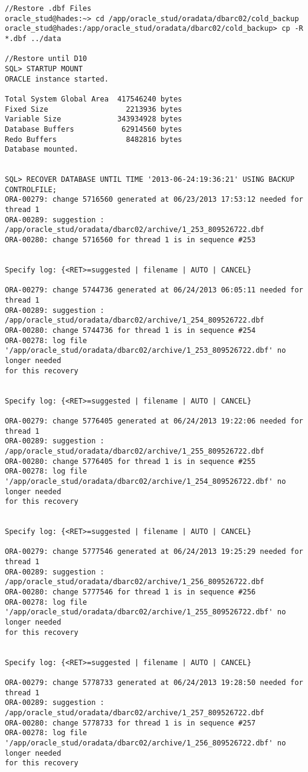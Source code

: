 \documentclass[11pt,a4paper,parskip=half]{scrartcl}
\begin{document}
\begin{lstlisting}
//Restore .dbf Files
oracle_stud@hades:~> cd /app/oracle_stud/oradata/dbarc02/cold_backup
oracle_stud@hades:/app/oracle_stud/oradata/dbarc02/cold_backup> cp -R *.dbf ../data

//Restore until D10
SQL> STARTUP MOUNT
ORACLE instance started.

Total System Global Area  417546240 bytes
Fixed Size                  2213936 bytes
Variable Size             343934928 bytes
Database Buffers           62914560 bytes
Redo Buffers                8482816 bytes
Database mounted.


SQL> RECOVER DATABASE UNTIL TIME '2013-06-24:19:36:21' USING BACKUP CONTROLFILE;
ORA-00279: change 5716560 generated at 06/23/2013 17:53:12 needed for thread 1
ORA-00289: suggestion :
/app/oracle_stud/oradata/dbarc02/archive/1_253_809526722.dbf
ORA-00280: change 5716560 for thread 1 is in sequence #253


Specify log: {<RET>=suggested | filename | AUTO | CANCEL}

ORA-00279: change 5744736 generated at 06/24/2013 06:05:11 needed for thread 1
ORA-00289: suggestion :
/app/oracle_stud/oradata/dbarc02/archive/1_254_809526722.dbf
ORA-00280: change 5744736 for thread 1 is in sequence #254
ORA-00278: log file
'/app/oracle_stud/oradata/dbarc02/archive/1_253_809526722.dbf' no longer needed
for this recovery


Specify log: {<RET>=suggested | filename | AUTO | CANCEL}

ORA-00279: change 5776405 generated at 06/24/2013 19:22:06 needed for thread 1
ORA-00289: suggestion :
/app/oracle_stud/oradata/dbarc02/archive/1_255_809526722.dbf
ORA-00280: change 5776405 for thread 1 is in sequence #255
ORA-00278: log file
'/app/oracle_stud/oradata/dbarc02/archive/1_254_809526722.dbf' no longer needed
for this recovery


Specify log: {<RET>=suggested | filename | AUTO | CANCEL}

ORA-00279: change 5777546 generated at 06/24/2013 19:25:29 needed for thread 1
ORA-00289: suggestion :
/app/oracle_stud/oradata/dbarc02/archive/1_256_809526722.dbf
ORA-00280: change 5777546 for thread 1 is in sequence #256
ORA-00278: log file
'/app/oracle_stud/oradata/dbarc02/archive/1_255_809526722.dbf' no longer needed
for this recovery


Specify log: {<RET>=suggested | filename | AUTO | CANCEL}

ORA-00279: change 5778733 generated at 06/24/2013 19:28:50 needed for thread 1
ORA-00289: suggestion :
/app/oracle_stud/oradata/dbarc02/archive/1_257_809526722.dbf
ORA-00280: change 5778733 for thread 1 is in sequence #257
ORA-00278: log file
'/app/oracle_stud/oradata/dbarc02/archive/1_256_809526722.dbf' no longer needed
for this recovery



\end{lstlisting}
\end{document}
